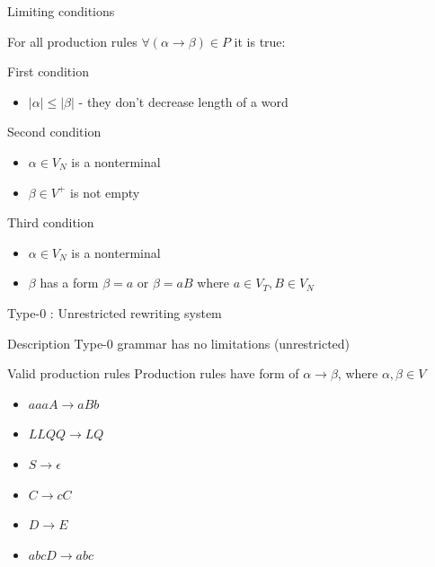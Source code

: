 \documentclass{beamer}
\begin{document}
\begin{frame}{Limiting conditions}

For all production rules $\forall (\alpha \rightarrow \beta)\in P$ it is true:

\begin{block}{First condition}
	\begin{itemize}
		\item $|\alpha| \leq |\beta|$ - they don't decrease length of a word
	\end{itemize}

\end{block}

\begin{block}{Second condition}
	\begin{itemize}
		\item $\alpha\in V_N$ is a nonterminal
		\item $\beta\in V^{+}$ is not empty
	\end{itemize}
\end{block}

\begin{block}{Third condition}
	\begin{itemize}
		\item $\alpha\in V_N$ is a nonterminal
		\item $\beta$ has a form $\beta=a$ or $\beta=aB$ where $a\in V_T, B\in V_N$
	\end{itemize}
\end{block}

\end{frame}


\begin{frame}{Type-0 : Unrestricted rewriting system}
	
	\begin{block}{Description}
		Type-0 grammar has no limitations (unrestricted)
	\end{block}
	
	\begin{exampleblock}{Valid production rules}
		Production rules have form of $\alpha\rightarrow\beta$, where $\alpha, \beta\in V$
		\begin{itemize}
			\item $aaaA\rightarrow aBb$
			\item $LLQQ\rightarrow LQ$
			\item $S\rightarrow\epsilon$
			\item $C\rightarrow cC$
			\item $D\rightarrow E$
			\item $abcD\rightarrow abc$
		\end{itemize}
	\end{exampleblock}
\end{frame}
\end{document}
